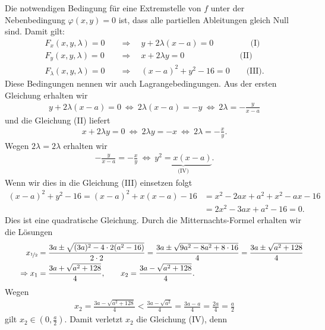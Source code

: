 Die notwendigen Bedingung für eine Extremstelle von $ f  $ unter der Nebenbedingung $ \varphi(x,y) = 0 $ ist, dass alle partiellen Ableitungen gleich Null sind. Damit gilt:
\begin{align*}
F_x(x,y,\lambda) = 0 \quad &\Rightarrow \quad y + 2 \lambda (x-a) = 0 \qquad \qquad  \ \  \textrm{(I)} \\
F_y(x,y,\lambda) = 0 \quad &\Rightarrow \quad x + 2 \lambda y = 0 \qquad \qquad \qquad \ \ \  \textrm{(II)}\\
F_\lambda(x,y,\lambda) = 0 \quad &\Rightarrow \quad (x-a)^2 +y^2 -16 = 0 \qquad \textrm{(III)}.
\end{align*}
Diese Bedingungen nennen wir auch Lagrangebedingungen.
Aus der ersten Gleichung erhalten wir
\begin{align*}
y + 2 \lambda (x-a) = 0  
\ \Leftrightarrow \
2 \lambda (x-a) = -y
\ \Leftrightarrow \
2 \lambda =  -\frac{y}{x-a}
\end{align*}
und die Gleichung (II) liefert 
\begin{align*}
x + 2 \lambda y = 0 
\ \Leftrightarrow \
2\lambda y = - x 
\ \Leftrightarrow \ 
2 \lambda = -\frac{x}{y}.
\end{align*}
Wegen $ 2 \lambda = 2 \lambda $ erhalten wir
\begin{align*}
 -\frac{y}{x-a} =  -\frac{x}{y}
\ \Leftrightarrow \
\underbrace{y^2 = x (x-a)}_{\textrm{(IV)}}. 
\end{align*}
Wenn wir dies in die Gleichung (III) einsetzen folgt 
\begin{align*}
(x-a)^2 +y^2 -16= (x-a)^2 + x(x-a) - 16 
&=
x^2 -2ax + a^2 + x^2 - ax - 16\\
&=
2x^2 - 3ax + a^2 - 16
= 0.
\end{align*}
Dies ist eine quadratische Gleichung. Durch die Mitternachts-Formel erhalten wir die Lösungen
\begin{align*}
x_{\nicefrac{1}{2}} 
&=
\frac{3a \pm \sqrt{(3a)^2 -4 \cdot 2 (a^2 - 16)}}{2 \cdot 2}
=
\frac{3a \pm \sqrt{9a^2 -8 a^2 + 8 \cdot 16}}{4}
=
\frac{3a \pm \sqrt{a^2 + 128}}{4}\\
\qquad
\Rightarrow 
x_1 
&=
\frac{3a + \sqrt{a^2 + 128}}{4}, \qquad
x_2
=
\frac{3a - \sqrt{a^2 + 128}}{4}.
\end{align*}
Wegen 
\begin{align*}
x_2
=
\frac{3a - \sqrt{a^2 + 128}}{4} < \frac{3a - \sqrt{a^2 }}{4}  = \frac{3a -a }{4} = \frac{2a}{4} = \frac{a}{2}
\end{align*}
gilt $ x_2 \in ( 0, \frac{a}{2}) $. Damit verletzt $ x_2 $ die Gleichung (IV), denn
